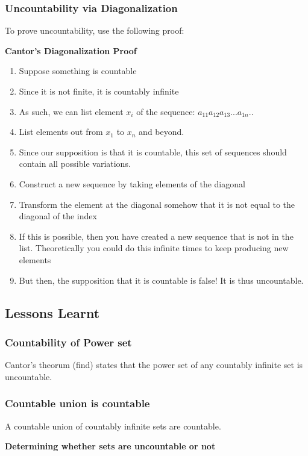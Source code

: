 \documentclass{article}
\newcommand{\sub}[1]{\vspace{10pt}\textbf{#1}}
\begin{document}
\subsubsection{Uncountability via Diagonalization}
To prove uncountability, use the following proof:
\begin{center}
    \textbf{Cantor's Diagonalization Proof}
\end{center}
\begin{enumerate}
    \item Suppose something is countable
    \item Since it is not finite, it is countably infinite
    \item As such, we can list element $x_i$ of the sequence: $a_{11}a_{12}a_{13}...a_{1n}..$
    \item List elements out from $x_1$ to $x_n$ and beyond.
    \item Since our supposition is that it is countable, this set of sequences should contain all possible variations.
    \item Construct a new sequence by taking elements of the diagonal
    \item Transform the element at the diagonal somehow that it is not equal to the diagonal of the index
    \item If this is possible, then you have created a new sequence that is not in the list. Theoretically you could do this infinite times to keep producing new elements
    \item But then, the supposition that it is countable is false! It is thus uncountable.
\end{enumerate}

\subsection{Lessons Learnt}
\subsubsection{Countability of Power set}
Cantor's theorum (find) states that the power set of any countably infinite set is uncountable.

\subsubsection{Countable union is countable}
A countable union of countably infinite sets are countable.

\sub{Determining whether sets are uncountable or not}
\end{document}
